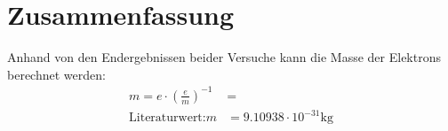 \documentclass[11pt, a4paper]{article}
\begin{document}
    \section{Zusammenfassung}

    Anhand von den Endergebnissen beider Versuche kann die Masse der Elektrons berechnet werden:
    \begin{align}
        m = e \cdot \left(\frac{e}{m}\right)^{-1} &= \\
        \text{Literaturwert:} m &= 9.10938 \cdot 10^{-31} \si{\kilogram}
    \end{align}
    
    

    
    
\end{document}
